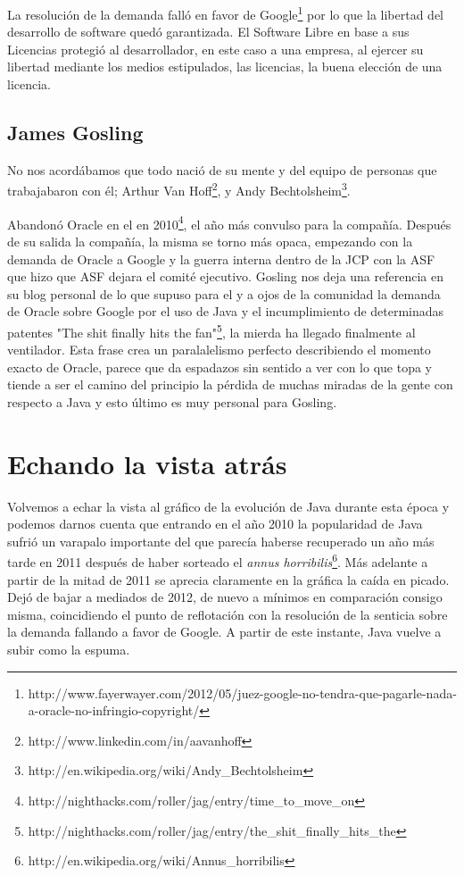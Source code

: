 \documentclass[11pt]{scrartcl}
\begin{document}
La resolución de la demanda falló en favor de Google\footnote{http://www.fayerwayer.com/2012/05/juez-google-no-tendra-que-pagarle-nada-a-oracle-no-infringio-copyright/} por lo que la libertad del desarrollo de software quedó garantizada. El Software Libre en base a sus Licencias protegió al desarrollador, en este caso a una empresa, al ejercer su libertad mediante los medios estipulados, las licencias, la buena elección de una licencia.

\subsection{James Gosling}

No nos acordábamos que todo nació de su mente y del equipo de personas que trabajabaron con él; Arthur Van Hoff\footnote{http://www.linkedin.com/in/aavanhoff}, y Andy Bechtolsheim\footnote{http://en.wikipedia.org/wiki/Andy\_Bechtolsheim}.

Abandonó Oracle en el en 2010\footnote{http://nighthacks.com/roller/jag/entry/time\_to\_move\_on}, el año más convulso para la compañía. Después de su salida la compañía, la misma se torno más opaca, empezando con la demanda de Oracle a Google y la guerra interna dentro de la JCP con la ASF que hizo que ASF dejara el comité ejecutivo. Gosling nos deja una referencia en su blog personal de lo que supuso para el y a ojos de la comunidad la demanda de Oracle sobre Google por el uso de Java y el incumplimiento de determinadas patentes "The shit finally hits the fan"\footnote{http://nighthacks.com/roller/jag/entry/the\_shit\_finally\_hits\_the}, la mierda ha llegado finalmente al ventilador. Esta frase crea un paralalelismo perfecto describiendo el momento exacto de Oracle, parece que da espadazos sin sentido a ver con lo que topa y tiende a ser el camino del principio la pérdida de muchas miradas de la gente con respecto a Java y esto último es muy personal para Gosling.

\section{Echando la vista atrás}

Volvemos a echar la vista al gráfico de la evolución de Java durante esta época y podemos darnos cuenta que entrando en el año 2010 la popularidad de Java sufrió un varapalo importante del que parecía haberse recuperado un año más tarde en 2011 después de haber sorteado el \emph{annus horribilis}\footnote{http://en.wikipedia.org/wiki/Annus\_horribilis}. Más adelante a partir de la mitad de 2011 se aprecia claramente en la gráfica la caída en picado. Dejó de bajar a mediados de 2012, de nuevo a mínimos en comparación consigo misma, coincidiendo el punto de reflotación con la resolución de la senticia sobre la demanda fallando a favor de Google. A partir de este instante, Java vuelve a subir como la espuma.
\end{document}
